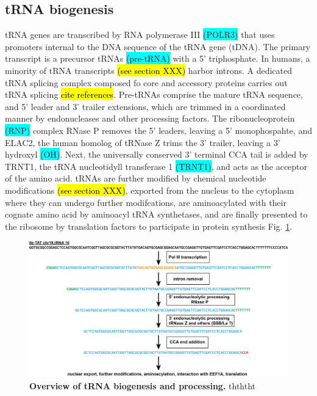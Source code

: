 \documentclass[12pt]{rockefeller}
\newcommand{\cyan}[1]{\colorbox{cyan}{#1}}
\begin{document}
\subsection{tRNA biogenesis}
tRNA genes are transcribed by RNA polymerase III \cyan{(POLR3)} that uses promoters internal to the DNA sequence of the tRNA gene (tDNA). The primary transcript is a precursor tRNAs \cyan{(pre-tRNA)} with a 5' triphosphate. In humans, a minority of tRNA transcripts \hl{(see section XXX)} harbor introns. A dedicated tRNA splicing complex composed fo core and accessory proteins carries out tRNA splicing \hl{cite references}. Pre-tRNAs comprise the mature tRNA sequence, and 5' leader and 3' trailer extensions, which are trimmed in a coordinated manner by endonucleases and other processing factors. The ribonucleoprotein \cyan{(RNP)} complex RNase P removes the 5' leaders, leaving a 5' monophospahte, and ELAC2, the human homolog of tRNase Z trims the 3' trailer, leaving a 3' hydroxyl \cyan{(OH)}. Next, the universally conserved 3' terminal CCA tail is added by TRNT1, the tRNA nucleotidyll transferase 1 \cyan{(TRNT1)}, and acts as the acceptor of the amino acid. tRNAs are further modified by chemical nucleotide modifications \hl{(see section XXX)}, exported from the nucleus to the cytoplasm where they can undergo further modifcations, are aminoacylated with their cognate amino acid by aminoacyl tRNA synthetases, and are finally presented to the ribosome by translation factors to participate in protein synthesis Fig. \ref{biogenesis}.
\newline
\begin{figure}[!ht]%
\centering
\includegraphics[width=\textwidth]{biogenesis.png}%
\caption[tRNA biogensis]{\textbf{Overview of tRNA biogenesis and processing.} thththt}
\label{biogenesis}%
\end{figure}
\end{document}
